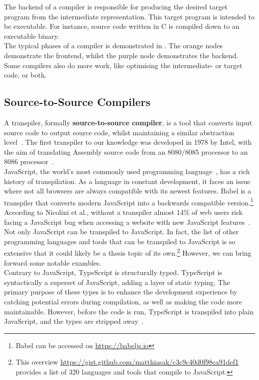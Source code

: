 The backend of a compiler is responsible for producing the desired target program from the intermediate representation. This target program is intended to be executable. For instance, source code written in C is compiled down to an executable binary. \\

The typical phases of a compiler is demonstrated in . The orange nodes demonstrate the frontend, whilst the purple node demonstrates the backend. Some compilers also do more work, like optimising the intermediate- or target code, or both.

\subsection{Source-to-Source Compilers}

A transpiler, formally \textbf{source-to-source compiler}, is a tool that converts input source code to output source code, whilst maintaining a similar abstraction level~\cite{whatIsATranspiler}. The first transpiler to our knowledge was developed in 1978 by Intel, with the aim of translating Assembly source code from an 8080/8085 processor to an 8086 processor~\cite{theFirstTranspiler}. \\

JavaScript, the world's most commonly used programming language~\cite{javaScriptIsCommon}, has a rich history of transpilation. As a language in constant development, it faces an issue where not all browsers are always compatible with its newest features. Babel is a transpiler that converts modern JavaScript into a backwards compatible version.\footnote{Babel can be accessed on \url{https://babeljs.io}} According to Nicolini et al., without a transpiler almost 14\% of web users risk facing a JavaScript bug when accessing a website with new JavaScript features~\cite{babelGood}. \\

Not only JavaScript can be transpiled to JavaScript. In fact, the list of other programming languages and tools that can be transpiled to JavaScript is so extensive that it could likely be a thesis topic of its own.\footnote{This overview \url{https://gist.github.com/matthiasak/c3c9c40d0f98ca91def1} provides a list of 320 languages and tools that compile to JavaScript.} However, we can bring forward some notable exambles. \\

Contrary to JavaScript, TypeScript is structurally typed. TypeScript is syntactically a superset of JavaScript, adding a layer of static typing. The primary purpose of these types is to enhance the development experience by catching potential errors during compilation, as well as making the code more maintainable. However, before the code is run, TypeScript is transpiled into plain JavaScript, and the types are stripped away~\cite{TypeScript}. \\

